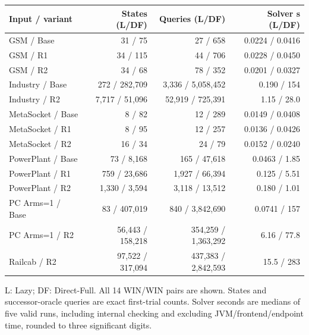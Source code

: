 \begingroup\small
\setlength{\tabcolsep}{3pt}
\renewcommand{\arraystretch}{1.04}
\begin{tabular}{@{}lrrr@{}}\toprule
Input / variant & States (L/DF) & Queries (L/DF) & Solver s (L/DF)\\\midrule
GSM / Base & 31 / 75 & 27 / 658 & 0.0224 / 0.0416\\
GSM / R1 & 34 / 115 & 44 / 706 & 0.0228 / 0.0450\\
GSM / R2 & 34 / 68 & 78 / 352 & 0.0201 / 0.0327\\
Industry / Base & 272 / 282,709 & 3,336 / 5,058,452 & 0.190 / 154\\
Industry / R2 & 7,717 / 51,096 & 52,919 / 725,391 & 1.15 / 28.0\\
MetaSocket / Base & 8 / 82 & 12 / 289 & 0.0149 / 0.0408\\
MetaSocket / R1 & 8 / 95 & 12 / 257 & 0.0136 / 0.0426\\
MetaSocket / R2 & 16 / 34 & 24 / 79 & 0.0152 / 0.0240\\
PowerPlant / Base & 73 / 8,168 & 165 / 47,618 & 0.0463 / 1.85\\
PowerPlant / R1 & 759 / 23,686 & 1,927 / 66,394 & 0.125 / 5.51\\
PowerPlant / R2 & 1,330 / 3,594 & 3,118 / 13,512 & 0.180 / 1.01\\
PC Arms=1 / Base & 83 / 407,019 & 840 / 3,842,690 & 0.0741 / 157\\
PC Arms=1 / R2 & 56,443 / 158,218 & 354,259 / 1,363,292 & 6.16 / 77.8\\
Railcab / R2 & 97,522 / 317,094 & 437,383 / 2,842,593 & 15.5 / 283\\
\bottomrule\end{tabular}\par
\smallskip\raggedright
L: Lazy; DF: Direct-Full. All 14 WIN/WIN pairs are shown. States and successor-oracle queries are exact first-trial counts. Solver seconds are medians of five valid runs, including internal checking and excluding JVM/frontend/endpoint time, rounded to three significant digits.
\par\endgroup
